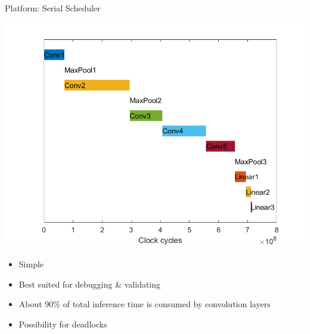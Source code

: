 \begin{frame}{Platform: Serial Scheduler}
	\begin{minipage}{0.6\textwidth}
		\centering
		\includegraphics[width=\textwidth]{../Images/Scheduling/Serial.png}\\
	\end{minipage}%
	\begin{minipage}{0.4\textwidth}
		\begin{itemize}
			\item Simple
			\item Best suited for debugging \& validating
			\item About 90\% of total inference time is consumed by convolution layers
			\item Possibility for deadlocks
		\end{itemize}
	\end{minipage}
\end{frame}

